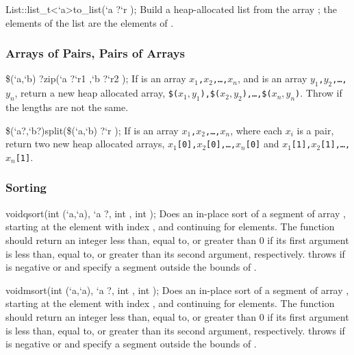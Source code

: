 \begin{defun2}{List::list_t<`a>}{to_list}{(`a {?}`r );}
  Build a heap-allocated list from the array ; the elements of
  the list are the elements of .
\end{defun2}

\subsubsection*{Arrays of Pairs, Pairs of Arrays}

\begin{defun2}{\$(`a,`b) ?}{zip}{(`a {?}`r1 ,`b {?}`r2 );}
  If  is an array \texttt{\lb$x_1$,$x_2$,\ldots,$x_n$\rb},
  and  is an array \texttt{\lb$y_1$,$y_2$,\ldots,$y_n$\rb},
  return a new heap allocated array,
  \texttt{\lb\$($x_1,y_1$),\$($x_2,y_2$),\ldots,\$($x_n,y_n$)\rb}.
  Throw  if the lengths are not the same.
\end{defun2}

\begin{defun2}{\$(`a?,`b?)}{split}{(\$(`a,`b) {?}`r );}
  If  is an array \texttt{\lb$x_1$,$x_2$,\ldots,$x_n$\rb},
  where each $x_i$ is a pair,
  return two new heap allocated arrays,
  \texttt{\lb$x_1$[0],$x_2$[0],\ldots,$x_n$[0]\rb}
  and
  \texttt{\lb$x_1$[1],$x_2$[1],\ldots,$x_n$[1]\rb}.
\end{defun2}

\subsubsection*{Sorting}

\begin{defun2}{void}{qsort}{(int (`a,`a), `a ?, int , int );}
  Does an in-place sort of a segment of array , starting at the
  element with index , and continuing for  elements.
  The function  should return an integer less than, equal
  to, or greater than 0 if its first argument is less than, equal to,
  or greater than its second argument, respectively.  
  throws  if  is
  negative or  and  specify a segment outside the
  bounds of .
\end{defun2}

\begin{defun2}{void}{msort}{(int (`a,`a), `a ?, int , int );}
  Does an in-place sort of a segment of array , starting at the
  element with index , and continuing for  elements.
  The function  should return an integer less than, equal
  to, or greater than 0 if its first argument is less than, equal to,
  or greater than its second argument, respectively.  
  throws  if  is
  negative or  and  specify a segment outside the
  bounds of .
\end{defun2}

